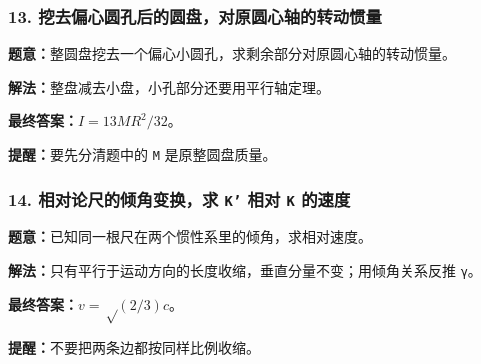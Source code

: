 \documentclass[12pt,a4paper]{ctexart}
\begin{document}
\subsubsection*{13. 挖去偏心圆孔后的圆盘，对原圆心轴的转动惯量}
\begin{tcolorbox}[colback=gray!2!white,colframe=black!60,title={题目}]
\textbf{题意：}整圆盘挖去一个偏心小圆孔，求剩余部分对原圆心轴的转动惯量。\par
\end{tcolorbox}
\begin{tcolorbox}[colback=blue!2!white,colframe=blue!55!black,title={完整答案}]
\textbf{解法：}整盘减去小盘，小孔部分还要用平行轴定理。\par
\textbf{最终答案：}\(I=13MR^2/32\)。\par

\end{tcolorbox}
\begin{tcolorbox}[colback=red!2!white,colframe=red!55!black,title={易错点}]
\textbf{提醒：}要先分清题中的 \texttt{M} 是原整圆盘质量。\par
\end{tcolorbox}

\subsubsection*{14. 相对论尺的倾角变换，求 \texttt{K'} 相对 \texttt{K} 的速度}
\begin{tcolorbox}[colback=gray!2!white,colframe=black!60,title={题目}]
\textbf{题意：}已知同一根尺在两个惯性系里的倾角，求相对速度。\par
\end{tcolorbox}
\begin{tcolorbox}[colback=blue!2!white,colframe=blue!55!black,title={完整答案}]
\textbf{解法：}只有平行于运动方向的长度收缩，垂直分量不变；用倾角关系反推 \texttt{γ}。\par
\textbf{最终答案：}\(v=√(2/3)c\)。\par

\end{tcolorbox}
\begin{tcolorbox}[colback=red!2!white,colframe=red!55!black,title={易错点}]
\textbf{提醒：}不要把两条边都按同样比例收缩。\par
\end{tcolorbox}
\end{document}
